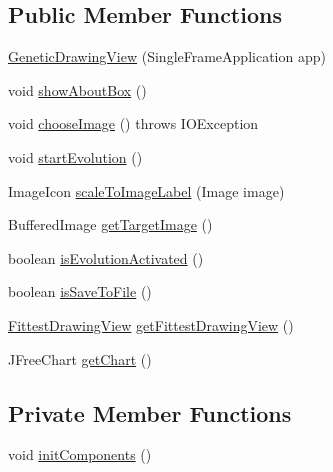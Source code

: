 \subsection*{Public Member Functions}
\begin{DoxyCompactItemize}
\item 
\hyperlink{classexamples_1_1gp_1_1monalisa_1_1gui_1_1_genetic_drawing_view_ac5f415714e918a1bc6c01e5d522876f0}{Genetic\-Drawing\-View} (Single\-Frame\-Application app)
\item 
void \hyperlink{classexamples_1_1gp_1_1monalisa_1_1gui_1_1_genetic_drawing_view_a949eca9bebd38a2f4620339b72ddf080}{show\-About\-Box} ()
\item 
void \hyperlink{classexamples_1_1gp_1_1monalisa_1_1gui_1_1_genetic_drawing_view_a0eacfc2d8b8e8e820cb689ceaac63f27}{choose\-Image} ()  throws I\-O\-Exception 
\item 
void \hyperlink{classexamples_1_1gp_1_1monalisa_1_1gui_1_1_genetic_drawing_view_afe709e27b8aceffd724f3cd4b56e0914}{start\-Evolution} ()
\item 
Image\-Icon \hyperlink{classexamples_1_1gp_1_1monalisa_1_1gui_1_1_genetic_drawing_view_a8d2d30f087aac9f68e676bbce2cfb6e7}{scale\-To\-Image\-Label} (Image image)
\item 
Buffered\-Image \hyperlink{classexamples_1_1gp_1_1monalisa_1_1gui_1_1_genetic_drawing_view_a2928bed1b551723e841aa644a62c0d36}{get\-Target\-Image} ()
\item 
boolean \hyperlink{classexamples_1_1gp_1_1monalisa_1_1gui_1_1_genetic_drawing_view_a124de9ea0c571d1a4cfc30ebc20946f5}{is\-Evolution\-Activated} ()
\item 
boolean \hyperlink{classexamples_1_1gp_1_1monalisa_1_1gui_1_1_genetic_drawing_view_a46423e99a1a957940ad5335ecb087afd}{is\-Save\-To\-File} ()
\item 
\hyperlink{classexamples_1_1gp_1_1monalisa_1_1gui_1_1_fittest_drawing_view}{Fittest\-Drawing\-View} \hyperlink{classexamples_1_1gp_1_1monalisa_1_1gui_1_1_genetic_drawing_view_ae383af254dabab7b3f3ef834652453fb}{get\-Fittest\-Drawing\-View} ()
\item 
J\-Free\-Chart \hyperlink{classexamples_1_1gp_1_1monalisa_1_1gui_1_1_genetic_drawing_view_a4a00e3e982a49967ee8d07779479f269}{get\-Chart} ()
\end{DoxyCompactItemize}
\subsection*{Private Member Functions}
\begin{DoxyCompactItemize}
\item 
void \hyperlink{classexamples_1_1gp_1_1monalisa_1_1gui_1_1_genetic_drawing_view_ab557cff80801244e998b7b84b11d8b43}{init\-Components} ()
\end{DoxyCompactItemize}
